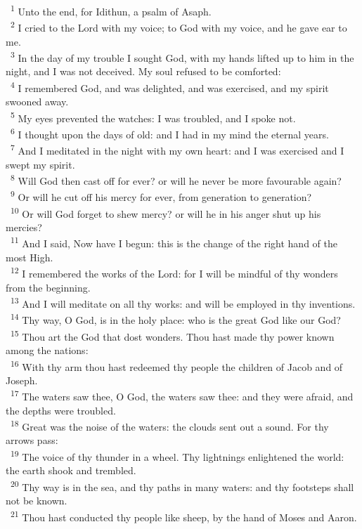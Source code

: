 \documentclass[a5paper,12pt]{article}
\begin{document}
\begin{multicols*}{2}
~\textsuperscript{1} Unto the end, for Idithun, a psalm of Asaph.\\
~\textsuperscript{2} I cried to the Lord with my voice; to God with my voice, and he gave ear to me.\\
~\textsuperscript{3} In the day of my trouble I sought God, with my hands lifted up to him in the night, and I was not deceived. My soul refused to be comforted:\\
~\textsuperscript{4} I remembered God, and was delighted, and was exercised, and my spirit swooned away.\\
~\textsuperscript{5} My eyes prevented the watches: I was troubled, and I spoke not.\\
~\textsuperscript{6} I thought upon the days of old: and I had in my mind the eternal years.\\
~\textsuperscript{7} And I meditated in the night with my own heart: and I was exercised and I swept my spirit.\\
~\textsuperscript{8} Will God then cast off for ever? or will he never be more favourable again?\\
~\textsuperscript{9} Or will he cut off his mercy for ever, from generation to generation?\\
~\textsuperscript{10} Or will God forget to shew mercy? or will he in his anger shut up his mercies?\\
~\textsuperscript{11} And I said, Now have I begun: this is the change of the right hand of the most High.\\
~\textsuperscript{12} I remembered the works of the Lord: for I will be mindful of thy wonders from the beginning.\\
~\textsuperscript{13} And I will meditate on all thy works: and will be employed in thy inventions.\\
~\textsuperscript{14} Thy way, O God, is in the holy place: who is the great God like our God?\\
~\textsuperscript{15} Thou art the God that dost wonders. Thou hast made thy power known among the nations:\\
~\textsuperscript{16} With thy arm thou hast redeemed thy people the children of Jacob and of Joseph.\\
~\textsuperscript{17} The waters saw thee, O God, the waters saw thee: and they were afraid, and the depths were troubled.\\
~\textsuperscript{18} Great was the noise of the waters: the clouds sent out a sound. For thy arrows pass:\\
~\textsuperscript{19} The voice of thy thunder in a wheel. Thy lightnings enlightened the world: the earth shook and trembled.\\
~\textsuperscript{20} Thy way is in the sea, and thy paths in many waters: and thy footsteps shall not be known.\\
~\textsuperscript{21} Thou hast conducted thy people like sheep, by the hand of Moses and Aaron.\\


\end{multicols*}
\end{document}
